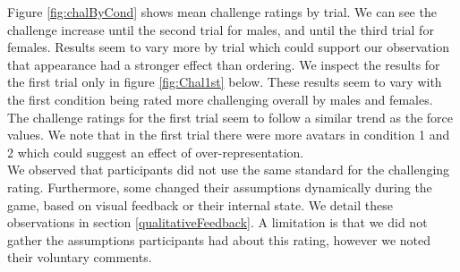 Figure \ref{fig:chalByCond} shows
mean challenge ratings by trial. We can see the challenge increase until the second trial for males, and until the third trial for females. Results seem to vary more by trial which could support our observation that appearance had a stronger effect than ordering.
We inspect the results for the first trial only in figure \ref{fig:Chal1st} below. These results seem to vary with the first condition being rated more challenging overall by males and females. The challenge ratings for the first trial seem to follow a similar trend as the force values. We note that in the first trial there were more avatars in condition 1 and 2 which could suggest an effect of over-representation. 
\\ We observed that participants did not use the same standard for the challenging rating. Furthermore, some changed their assumptions dynamically during the game, based on visual feedback or their internal state. We detail these observations in section \ref{qualitativeFeedback}. A limitation is that we did not gather the assumptions participants had about this rating, however we noted their voluntary comments.

